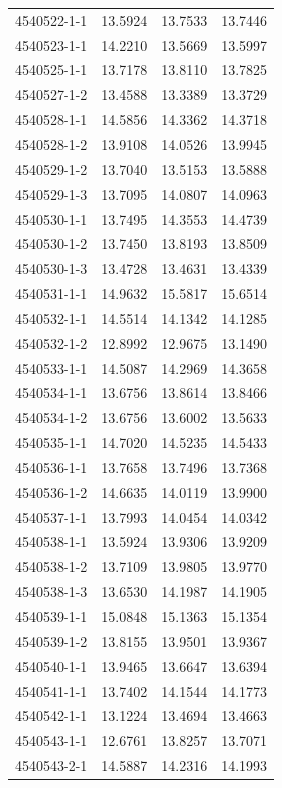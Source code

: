 \begin{longtable}{lrrr}
4540522-1-1 & 13.5924 & 13.7533 & 13.7446 \\
4540523-1-1 & 14.2210 & 13.5669 & 13.5997 \\
4540525-1-1 & 13.7178 & 13.8110 & 13.7825 \\
4540527-1-2 & 13.4588 & 13.3389 & 13.3729 \\
4540528-1-1 & 14.5856 & 14.3362 & 14.3718 \\
4540528-1-2 & 13.9108 & 14.0526 & 13.9945 \\
4540529-1-2 & 13.7040 & 13.5153 & 13.5888 \\
4540529-1-3 & 13.7095 & 14.0807 & 14.0963 \\
4540530-1-1 & 13.7495 & 14.3553 & 14.4739 \\
4540530-1-2 & 13.7450 & 13.8193 & 13.8509 \\
4540530-1-3 & 13.4728 & 13.4631 & 13.4339 \\
4540531-1-1 & 14.9632 & 15.5817 & 15.6514 \\
4540532-1-1 & 14.5514 & 14.1342 & 14.1285 \\
4540532-1-2 & 12.8992 & 12.9675 & 13.1490 \\
4540533-1-1 & 14.5087 & 14.2969 & 14.3658 \\
4540534-1-1 & 13.6756 & 13.8614 & 13.8466 \\
4540534-1-2 & 13.6756 & 13.6002 & 13.5633 \\
4540535-1-1 & 14.7020 & 14.5235 & 14.5433 \\
4540536-1-1 & 13.7658 & 13.7496 & 13.7368 \\
4540536-1-2 & 14.6635 & 14.0119 & 13.9900 \\
4540537-1-1 & 13.7993 & 14.0454 & 14.0342 \\
4540538-1-1 & 13.5924 & 13.9306 & 13.9209 \\
4540538-1-2 & 13.7109 & 13.9805 & 13.9770 \\
4540538-1-3 & 13.6530 & 14.1987 & 14.1905 \\
4540539-1-1 & 15.0848 & 15.1363 & 15.1354 \\
4540539-1-2 & 13.8155 & 13.9501 & 13.9367 \\
4540540-1-1 & 13.9465 & 13.6647 & 13.6394 \\
4540541-1-1 & 13.7402 & 14.1544 & 14.1773 \\
4540542-1-1 & 13.1224 & 13.4694 & 13.4663 \\
4540543-1-1 & 12.6761 & 13.8257 & 13.7071 \\
4540543-2-1 & 14.5887 & 14.2316 & 14.1993 \\

\end{longtable}
